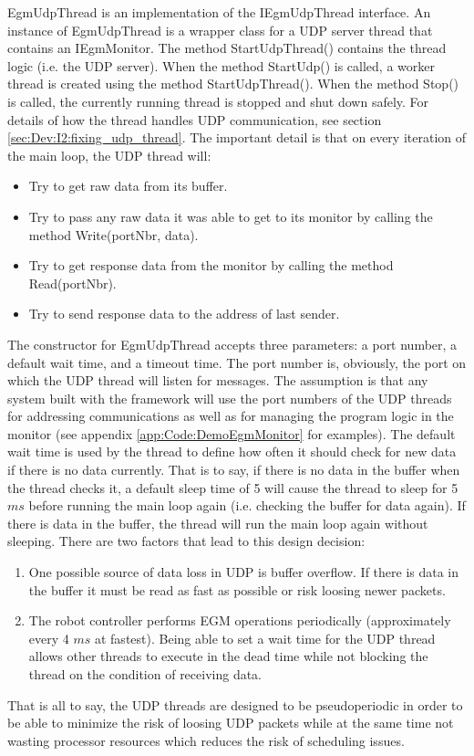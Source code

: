 \documentclass{cslthse-msc}
\begin{document}
\newpage
EgmUdpThread is an implementation of the IEgmUdpThread interface. An instance of EgmUdpThread is a wrapper class for a UDP server thread that contains an IEgmMonitor. The method StartUdpThread() contains the thread logic (i.e. the UDP server). When the method StartUdp() is called, a worker thread is created using the method StartUdpThread(). When the method Stop() is called, the currently running thread is stopped and shut down safely. For details of how the thread handles UDP communication, see section \ref{sec:Dev:I2:fixing_udp_thread}. The important detail is that on every iteration of the main loop, the UDP thread will:
\begin{itemize}
    \item Try to get raw data from its buffer.
    \item Try to pass any raw data it was able to get to its monitor by calling the method Write(portNbr, data).
    \item Try to get response data from the monitor by calling the method Read(portNbr).
    \item Try to send response data to the address of last sender.
\end{itemize}
The constructor for EgmUdpThread accepts three parameters: a port number, a default wait time, and a timeout time. The port number is, obviously, the port on which the UDP thread will listen for messages. The assumption is that any system built with the framework will use the port numbers of the UDP threads for addressing communications as well as for managing the program logic in the monitor (see appendix \ref{app:Code:DemoEgmMonitor} for examples). The default wait time is used by the thread to define how often it should check for new data if there is no data currently. That is to say, if there is no data in the buffer when the thread checks it, a default sleep time of 5 will cause the thread to sleep for 5 $ms$ before running the main loop again (i.e. checking the buffer for data again). If there is data in the buffer, the thread will run the main loop again without sleeping. There are two factors that lead to this design decision:
\begin{enumerate}
    \item One possible source of data loss in UDP is buffer overflow. If there is data in the buffer it must be read as fast as possible or risk loosing newer packets.
    \item The robot controller performs EGM operations periodically (approximately every 4 $ms$ at fastest). Being able to set a wait time for the UDP thread allows other threads to execute in the dead time while not blocking the thread on the condition of receiving data. 
\end{enumerate}
That is all to say, the UDP threads are designed to be pseudoperiodic in order to be able to minimize the risk of loosing UDP packets while at the same time not wasting processor resources which reduces the risk of scheduling issues. \par
\end{document}
